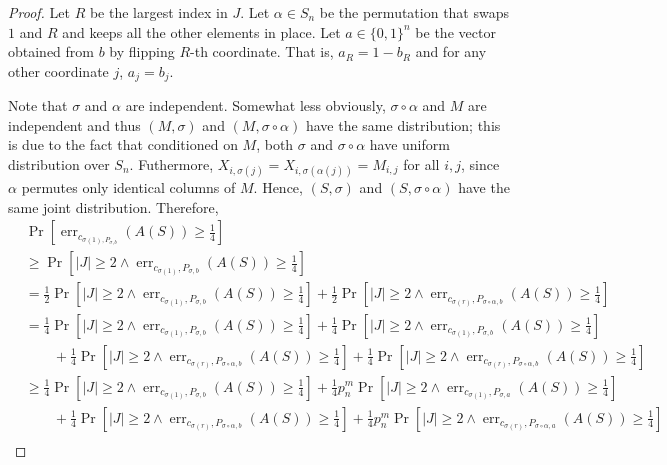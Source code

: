 \documentclass[10pt]{article}
\DeclareMathOperator{\err}{err}
\begin{document}
\begin{proof}
Let $R$ be the largest index in $J$. Let $\alpha \in S_n$ be the permutation
that swaps $1$ and $R$ and keeps all the other elements in place. Let $a \in
\{0,1\}^n$ be the vector obtained from $b$ by flipping $R$-th coordinate.
That is, $a_R = 1 - b_R$ and for any other coordinate $j$, $a_j = b_j$.

Note that $\sigma$ and $\alpha$ are independent. Somewhat less obviously,
$\sigma \circ \alpha$ and $M$ are independent and thus $(M,\sigma)$ and $(M,
\sigma \circ \alpha)$ have the same distribution; this is due to the fact that
conditioned on $M$, both $\sigma$ and $\sigma \circ \alpha$ have uniform
distribution over $S_n$. Futhermore, $X_{i,\sigma(j)} = X_{i,\sigma(\alpha(j))} =
M_{i,j}$ for all $i,j$, since $\alpha$ permutes only identical columns of $M$.
Hence, $(S,\sigma)$ and $(S,\sigma \circ \alpha)$ have the same joint
distribution. Therefore,
\begin{align*}
& \Pr \left[ \err_{c_{\sigma(1),P_{\sigma, b}}}(A(S)) \ge \frac{1}{4} \right] \\
& \ge \Pr \left[ |J| \ge 2 \wedge \err_{c_{\sigma(1)},P_{\sigma, b}}(A(S)) \ge \frac{1}{4} \right] \\
& = \frac{1}{2} \Pr \left[ |J| \ge 2 \wedge \err_{c_{\sigma(1)},P_{\sigma, b}}(A(S)) \ge \frac{1}{4} \right] + \frac{1}{2} \Pr \left[ |J| \ge 2 \wedge \err_{c_{\sigma(r)},P_{\sigma \circ \alpha, b}}(A(S)) \ge \frac{1}{4} \right]  \\
& = \frac{1}{4} \Pr \left[ |J| \ge 2 \wedge \err_{c_{\sigma(1)},P_{\sigma, b}}(A(S)) \ge \frac{1}{4} \right] + \frac{1}{4} \Pr \left[ |J| \ge 2 \wedge \err_{c_{\sigma(1)},P_{\sigma, b}}(A(S)) \ge \frac{1}{4} \right] \\
& \qquad + \frac{1}{4} \Pr \left[ |J| \ge 2 \wedge \err_{c_{\sigma(r)},P_{\sigma \circ \alpha, b}}(A(S)) \ge \frac{1}{4} \right] + \frac{1}{4} \Pr \left[ |J| \ge 2 \wedge \err_{c_{\sigma(r)},P_{\sigma \circ \alpha, b}}(A(S)) \ge \frac{1}{4} \right] \\
& \ge \frac{1}{4} \Pr \left[ |J| \ge 2 \wedge \err_{c_{\sigma(1)},P_{\sigma, b}}(A(S)) \ge \frac{1}{4} \right] + \frac{1}{4} p_n^m  \Pr \left[ |J| \ge 2 \wedge \err_{c_{\sigma(1)},P_{\sigma, a}}(A(S)) \ge \frac{1}{4} \right] \\
& \qquad + \frac{1}{4} \Pr \left[ |J| \ge 2 \wedge \err_{c_{\sigma(r)},P_{\sigma \circ \alpha, b}}(A(S)) \ge \frac{1}{4} \right] + \frac{1}{4} p_n^m \Pr \left[ |J| \ge 2 \wedge \err_{c_{\sigma(r)},P_{\sigma \circ \alpha, a}}(A(S)) \ge \frac{1}{4} \right] \\

\end{align*}
\end{proof}
\end{document}
